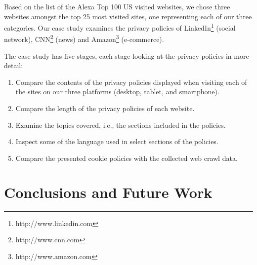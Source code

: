 \documentclass{acm_proc_article-sp}
\begin{document}
Based on the list of the Alexa Top 100 US visited websites, we chose three websites amongst the top 25 most visited sites, one representing each of our three categories. Our case study examines the privacy policies of LinkedIn\footnote{http://www.linkedin.com} (social network), CNN\footnote{http://www.cnn.com} (news) and Amazon\footnote{http://www.amazon.com} (e-commerce).

The case study has five stages, each stage looking at the privacy policies in more detail:
\begin{enumerate}
\item Compare the contents of the privacy policies displayed when visiting each of the sites on our three platforms (desktop, tablet, and smartphone).
\item Compare the length of the privacy policies of each website.
\item Examine the topics covered, i.e., the sections included in the policies.
\item Inspect some of the language used in select sections of the policies.
\item Compare the presented cookie policies with the collected web crawl data.
\end{enumerate}

\section{Conclusions and Future Work}

\nocite{*}


\end{document}
